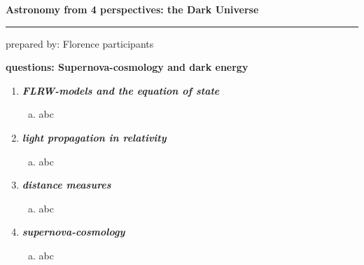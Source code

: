 \documentclass[a4paper,12pt]{article}
\newcommand{\question}[1]{\textbf{\textit{#1}}}
\newcommand{\HRule}{\rule{\linewidth}{0.3mm}}
\begin{document}
\pagestyle{empty}

\begin{center}
\LARGE \textbf{Astronomy from 4 perspectives: the Dark Universe}
\HRule
\end{center}
\begin{flushright}
prepared by: Florence participants
\end{flushright}
\begin{center}
{\Large \textbf{questions: Supernova-cosmology and dark energy}}
\end{center}
\vspace{5mm}

\begin{enumerate}

\item \question{FLRW-models and the equation of state}\\
\begin{enumerate}[(a)]
\item{abc}
\end{enumerate}

\item \question{light propagation in relativity}\\
\begin{enumerate}[(a)]
\item{abc}
\end{enumerate}

\item \question{distance measures}\\
\begin{enumerate}[(a)]
\item{abc}
\end{enumerate}

\item \question{supernova-cosmology}\\
\begin{enumerate}[(a)]
\item{abc}
\end{enumerate}


\end{enumerate}
\end{document}
